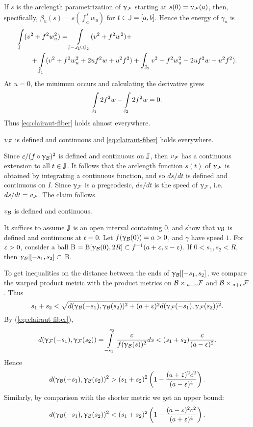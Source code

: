 {If $s$ is the arclength parametrization of $\upgamma_{\mathcal{F}}$ starting at
$s(0) = \upgamma_{\mathcal{F}}(a)$, then, specifically, $\beta_u(s) = s(\int_a^s
w_u)$ for $t \in\JJ= [a,b]$. Hence the energy of $\gamma_u$ is
\begin{align*}
\int\limits_\JJ(v&^2+f^2w_u^2) 
= \int\limits_{\JJ -J_1\cup \JJ_2} (v^2+f^2w^2) +\\
&+\int\limits_{\JJ_1}(v^2+f^2w_u^2 + 2uf^2w + u^2f^2) +\int_{\JJ_2}v^2+f^2w_u^2 - 2uf^2w
+ u^2f^2).
\end{align*}
At $u=0$,  the minimum occurs and calculating the
derivative gives
$$\int\limits_{\mathbb{J}_1} 2f^2w - \int\limits_{\mathbb{J}_2} 2f^2w = 0.$$ 
Thus \ref{eq:clairaut-fiber} holds almost everywhere.  

\begin{clm}{}\label{clm:clairaut} $v_{\mathcal{F}}$ is defined and continuous and \ref{eq:clairaut-fiber} holds everywhere.
\end{clm}
Since $c/(f\circ \gamma_\spc{B})^{2}$ is defined and continuous on $\mathbb{J}$, then $v_ {\mathcal{F}}$ has a continuous extension to all $t\in \JJ$. It follows that the arclength function  $s(t)$ of   $\upgamma_{\mathcal{F}}$ is obtained by integrating a continuous function, and so $ds/dt$ is defined and continuous on $I$.  Since $\upgamma_{\mathcal{F}}$ is a pregeodesic, $ds/dt$ is the speed of $\upgamma_{\mathcal{F}}$, i.e. $ds/dt=v_{\mathcal{F}}$.  The claim follows.

\begin{clm}{}\label{clm:v_B} $v_{\mathcal{B}}$ is defined and continuous.
\end{clm}


It suffices to assume $\mathbb{J}$ is an open interval containing $0$, and show that $v_{\mathcal{B}}$ is defined and continuous at $t=0$. Let  $f(\upgamma_{\mathcal{B}}(0))=a>0$, and $\gamma$ have speed $1$.  For 
 $\upvarepsilon>0$, consider a ball B $=\oBall[\gamma_\spc{B}(0),2R]\subset f^{-1}(a+\eps,a-\eps)$.  If $0<s_1,s_2< R$, then $\gamma_\spc{B}|[-s_1,s_2]\subset$ B.
 

To get inequalities on the distance between the ends of $\upgamma_{\mathcal{B}}|[-s_1,s_2]$,
we compare the warped product metric with the  product metrics on
$\spc{B}\times_{a-\eps}\spc{F}$ and $\spc{B}\times_{a+\eps}\spc{F}$.  Thus 
$$s_1+s_2 < \sqrt{d(\upgamma_{\mathcal{B}}(-s_1),\upgamma_{\mathcal{B}}(s_2))^2
+ (a+\upvarepsilon)^2d(\upgamma_{\mathcal{F}}(-s_1),\upgamma_{\mathcal{F}}(s_2))^2}.$$
By (\ref{eq:clairaut-fiber}),
$$d(\upgamma_{\mathcal{F}}(-s_1),\upgamma_{\mathcal{F}}(s_2)) = 
\int\limits_{-s_1}^{s_2}\frac{c}{f(\upgamma_{\mathcal{B}}(s))^2}ds
< (s_1+s_2)\frac{c}{(a-\upvarepsilon)^2}.$$
Hence
$$d(\upgamma_{\mathcal{B}}(-s_1), \upgamma_{\mathcal{B}}(s_2))^2 >
(s_1+s_2)^2\left(1 -\frac{(a+\upvarepsilon)^2c^2}{(a-\upvarepsilon)^4}\right).$$
Similarly, by comparison with the shorter metric we get an upper bound:
$$d(\upgamma_{\mathcal{B}}(-s_1), \upgamma_{\mathcal{B}}(s_2))^2 <
(s_1+s_2)^2\left(1 -\frac{(a-\upvarepsilon)^2c^2}{(a+\upvarepsilon)^4}\right).$$

}
